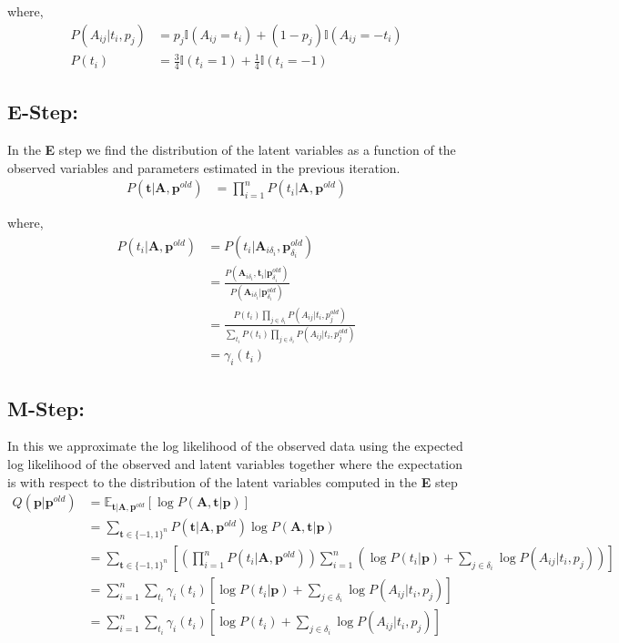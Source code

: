 \documentclass[12pt,onecolumn,letterpaper]{article}
\begin{document}
\noindent
where,
\begin{align*}
P(A_{ij}|t_i,p_j) &= p_j\mathbb{I}(A_{ij}=t_i)+(1-p_j)\mathbb{I}(A_{ij}=-t_i) \\
P(t_i) &= 
\frac{3}{4}\mathbb{I}(t_i=1)+\frac{1}{4}\mathbb{I}(t_i=-1)
\end{align*}

\subsection*{E-Step:}
In the \textbf{E} step we find the distribution of the latent variables as a function of the observed variables and parameters estimated in the previous iteration.
\begin{align*}
P(\textbf{t}|\textbf{A},\textbf{p}^{old}) &= 
\prod_{i=1}^{n} P(t_i|\textbf{A},\textbf{p}^{old})
\end{align*}

\noindent
where,
\begin{align*}
P(t_i|\textbf{A},\textbf{p}^{old}) &=
P(t_i|\textbf{A}_{i\delta_i},\textbf{p}_{\delta_i}^{old}) \\
&= 
\frac{
P(\textbf{A}_{i\delta_i},\textbf{t}_i|\textbf{p}_{\delta_i}^{old})
} 	
{
P(\textbf{A}_{i\delta_i}|\textbf{p}_{\delta_i}^{old})
} \\
&=
\frac{
P(t_i)\prod_{j\in \delta_i} P(A_{ij}|t_i,p_j^{old})
}
{
\sum_{t_i} P(t_i)\prod_{j\in \delta_i} P(A_{ij}|t_i,p_j^{old})
} \\
&= \gamma_i(t_i)
\end{align*}

\subsection*{M-Step:}
In this we approximate the log likelihood of the observed data using the expected log likelihood of the observed and latent variables together where the expectation is with respect to the distribution of the latent variables computed in the \textbf{E} step
\begin{align*}
Q(\textbf{p}|\textbf{p}^{old}) &= 
\mathbb{E}_{
\textbf{t}|\textbf{A},\textbf{p}^{old}
}
\left[
\log{
P(\textbf{A},\textbf{t}|\textbf{p})
}
\right] \\
&=
\sum_{\textbf{t}\in \{-1,1\}^n} 
P(\textbf{t}|\textbf{A},\textbf{p}^{old})
\log{
P(\textbf{A},\textbf{t}|\textbf{p})
} \\
&= 
\sum_{\textbf{t}\in \{-1,1\}^n}
\left[
\left(
\prod_{i=1}^{n} P(t_i|\textbf{A},\textbf{p}^{old})
\right)
\sum_{i=1}^{n}
\left(
\log{P(t_i|\textbf{p})} +
\sum_{j\in \delta_i} 
\log P(A_{ij}|t_i,p_j) 
\right)
\right] \\
&=
\sum_{i=1}^{n}
\sum_{t_i} \gamma_i(t_i) 
\left[
\log{P(t_i|\textbf{p})} +
\sum_{j\in \delta_i} 
\log P(A_{ij}|t_i,p_j) 
\right] \\
&=
\sum_{i=1}^{n}
\sum_{t_i} \gamma_i(t_i) 
\left[
\log{P(t_i)} +
\sum_{j\in \delta_i} 
\log P(A_{ij}|t_i,p_j) 
\right]
\end{align*}
\end{document}
